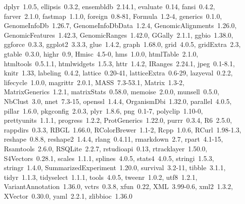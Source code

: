 \documentclass{article}
\begin{document}
\begin{Schunk}
\begin{itemize}
    dplyr~1.0.5, ellipsis~0.3.2, ensembldb~2.14.1, evaluate~0.14,
    fansi~0.4.2, farver~2.1.0, fastmap~1.1.0, foreign~0.8-81,
    Formula~1.2-4, generics~0.1.0, GenomeInfoDb~1.26.7,
    GenomeInfoDbData~1.2.4, GenomicAlignments~1.26.0,
    GenomicFeatures~1.42.3, GenomicRanges~1.42.0, GGally~2.1.1,
    ggbio~1.38.0, ggforce~0.3.3, ggplot2~3.3.3, glue~1.4.2,
    graph~1.68.0, grid~4.0.5, gridExtra~2.3, gtable~0.3.0, highr~0.9,
    Hmisc~4.5-0, hms~1.0.0, htmlTable~2.1.0, htmltools~0.5.1.1,
    htmlwidgets~1.5.3, httr~1.4.2, IRanges~2.24.1, jpeg~0.1-8.1,
    knitr~1.33, labeling~0.4.2, lattice~0.20-41, latticeExtra~0.6-29,
    lazyeval~0.2.2, lifecycle~1.0.0, magrittr~2.0.1, MASS~7.3-53.1,
    Matrix~1.3-2, MatrixGenerics~1.2.1, matrixStats~0.58.0,
    memoise~2.0.0, munsell~0.5.0, NbClust~3.0, nnet~7.3-15,
    openssl~1.4.4, OrganismDbi~1.32.0, parallel~4.0.5, pillar~1.6.0,
    pkgconfig~2.0.3, plyr~1.8.6, png~0.1-7, polyclip~1.10-0,
    prettyunits~1.1.1, progress~1.2.2, ProtGenerics~1.22.0,
    purrr~0.3.4, R6~2.5.0, rappdirs~0.3.3, RBGL~1.66.0,
    RColorBrewer~1.1-2, Rcpp~1.0.6, RCurl~1.98-1.3, reshape~0.8.8,
    reshape2~1.4.4, rlang~0.4.11, rmarkdown~2.7, rpart~4.1-15,
    Rsamtools~2.6.0, RSQLite~2.2.7, rstudioapi~0.13,
    rtracklayer~1.50.0, S4Vectors~0.28.1, scales~1.1.1, splines~4.0.5,
    stats4~4.0.5, stringi~1.5.3, stringr~1.4.0,
    SummarizedExperiment~1.20.0, survival~3.2-11, tibble~3.1.1,
    tidyr~1.1.3, tidyselect~1.1.1, tools~4.0.5, tweenr~1.0.2,
    utf8~1.2.1, VariantAnnotation~1.36.0, vctrs~0.3.8, xfun~0.22,
    XML~3.99-0.6, xml2~1.3.2, XVector~0.30.0, yaml~2.2.1,
    zlibbioc~1.36.0
\end{itemize}\end{Schunk}


\end{document}
